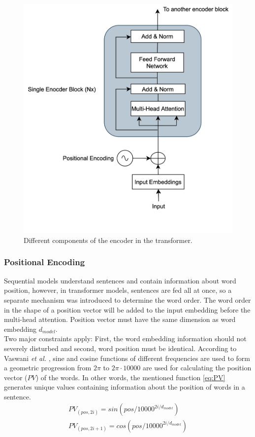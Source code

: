 \documentclass[%
	BCOR=8mm, %
	DIV=12,
	toc=bibliography, %
	toc=listof, %
	oneside, %
	egregdoesnotlikesansseriftitles, %
	]{scrbook}
\begin{document}
\begin{figure}[H]
\centering
\includegraphics[width=.50\textwidth]{img/EncoderArch.png}
\caption[Different components of an encoder in transformer]{Different components of the encoder in the transformer.}
\label{diag:EncoderArch}
\end{figure}
\subsubsection{Positional Encoding}
Sequential models understand sentences and contain information about word position, however, in transformer models, sentences are fed all at once, so a separate mechanism was introduced to determine the word order. The word order in the shape of a position vector will be added to the input embedding before the multi-head attention. Position vector must have the same dimension as word embedding $d_{model}$.\\
Two major constraints apply: First, the word embedding information should not severely disturbed and second, word position must be identical. According to Vaswani \textit{et al.} \cite{vaswani_attention_2017}, sine and cosine functions of different frequencies are used to form a geometric progression from  $2\pi$ to $2\pi \cdot 10000$ are used for calculating the position vector ($PV$) of the words. In other words, the mentioned function \ref{eq:PV} generates unique values containing information about the position of words in a sentence.
\begin{equation}
\begin{aligned}
    PV_{(pos,2i)}=sin(pos/10000^{2i/d_{model}})\\
    PV_{(pos,2i+1)}=cos(pos/10000^{2i/d_{model}})
    \label{eq:PV}
\end{aligned}
\end{equation}
\end{document}
